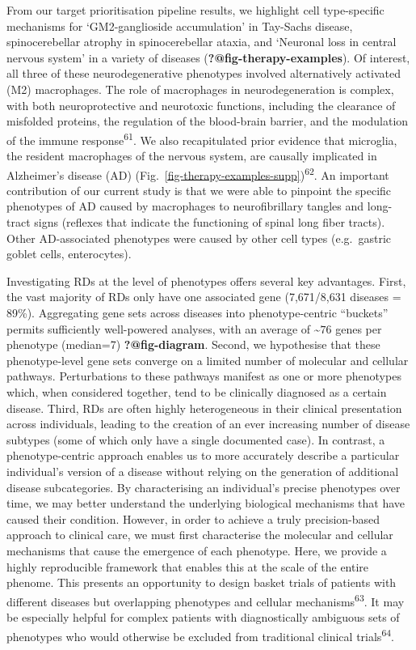 \documentclass[
]{report}
\begin{document}
From our target prioritisation pipeline results, we highlight cell
type-specific mechanisms for `GM2-ganglioside accumulation' in Tay-Sachs
disease, spinocerebellar atrophy in spinocerebellar ataxia, and
`Neuronal loss in central nervous system' in a variety of diseases
(\textbf{?@fig-therapy-examples}). Of interest, all three of these
neurodegenerative phenotypes involved alternatively activated (M2)
macrophages. The role of macrophages in neurodegeneration is complex,
with both neuroprotective and neurotoxic functions, including the
clearance of misfolded proteins, the regulation of the blood-brain
barrier, and the modulation of the immune response\textsuperscript{61}.
We also recapitulated prior evidence that microglia, the resident
macrophages of the nervous system, are causally implicated in
Alzheimer's disease (AD)
(Fig.~\ref{fig-therapy-examples-supp})\textsuperscript{62}. An important
contribution of our current study is that we were able to pinpoint the
specific phenotypes of AD caused by macrophages to neurofibrillary
tangles and long-tract signs (reflexes that indicate the functioning of
spinal long fiber tracts). Other AD-associated phenotypes were caused by
other cell types (e.g.~gastric goblet cells, enterocytes).

Investigating RDs at the level of phenotypes offers several key
advantages. First, the vast majority of RDs only have one associated
gene (7,671/8,631 diseases = 89\%). Aggregating gene sets across
diseases into phenotype-centric ``buckets'' permits sufficiently
well-powered analyses, with an average of \textasciitilde{}\(76\) genes
per phenotype (median=7) \textbf{?@fig-diagram}. Second, we hypothesise
that these phenotype-level gene sets converge on a limited number of
molecular and cellular pathways. Perturbations to these pathways
manifest as one or more phenotypes which, when considered together, tend
to be clinically diagnosed as a certain disease. Third, RDs are often
highly heterogeneous in their clinical presentation across individuals,
leading to the creation of an ever increasing number of disease subtypes
(some of which only have a single documented case). In contrast, a
phenotype-centric approach enables us to more accurately describe a
particular individual's version of a disease without relying on the
generation of additional disease subcategories. By characterising an
individual's precise phenotypes over time, we may better understand the
underlying biological mechanisms that have caused their condition.
However, in order to achieve a truly precision-based approach to
clinical care, we must first characterise the molecular and cellular
mechanisms that cause the emergence of each phenotype. Here, we provide
a highly reproducible framework that enables this at the scale of the
entire phenome. This presents an opportunity to design basket trials of
patients with different diseases but overlapping phenotypes and cellular
mechanisms\textsuperscript{63}. It may be especially helpful for complex
patients with diagnostically ambiguous sets of phenotypes who would
otherwise be excluded from traditional clinical
trials\textsuperscript{64}.
\end{document}
